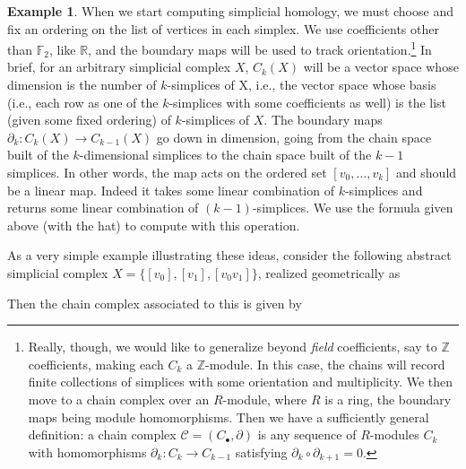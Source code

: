 \documentclass[a4paper]{book}
\theoremstyle{definition}
\newtheorem{example}{Example}[section]
\theoremstyle{definition}
\theoremstyle{definition}
\theoremstyle{theorem}
\theoremstyle{definition}
\begin{document}
\begin{example}
	When we start computing simplicial homology, we must choose and fix an ordering on the list of vertices in each simplex. We use coefficients other than $\mathbb{F}_2$, like $\mathbb{R}$, and the boundary maps will be used to track orientation.\footnote{Really, though, we would like to generalize beyond \textit{field} coefficients, say to $\mathbb{Z}$ coefficients, making each $C_k$ a $\mathbb{Z}$-module. In this case, the chains will record finite collections of simplices with some orientation and multiplicity. We then move to a chain complex over an $R$-module, where $R$ is a ring, the boundary maps being module homomorphisms. Then we have a sufficiently general definition: a chain complex $\mathscr{C} = (C_{\bullet}, \partial)$ is any sequence of $R$-modules $C_k$ with homomorphisms $\partial_k: C_k \rightarrow C_{k-1}$ satisfying $\partial_k \circ \partial_{k+1} = 0$.} In brief, for an arbitrary simplicial complex $X$, $C_k (X)$ will be a vector space whose dimension is the number of $k$-simplices of X, i.e., the vector space whose basis (i.e., each row as one of the $k$-simplices with some coefficients as well) is the list (given some fixed ordering) of $k$-simplices of $X$. The boundary maps $\partial_k: C_k(X) \rightarrow C_{k-1}(X)$ go down in dimension, going from the chain space built of the $k$-dimensional simplices to the chain space built of the $k-1$ simplices. In other words, the map acts on the ordered set $[v_0,\dots,v_k]$ and should be a linear map.  Indeed it takes some linear combination of $k$-simplices and returns some linear combination of $(k-1)$-simplices. We use the formula given above (with the hat) to compute with this operation.\par 
	As a very simple example illustrating these ideas, consider the following abstract simplicial complex $X = \{[v_0],[v_1],[v_0v_1]\}$, realized geometrically as 
		\begin{center} 
			 \end{center} \par \noindent 
	Then the chain complex associated to this is given by 
	\par 

\end{example}
\end{document}
